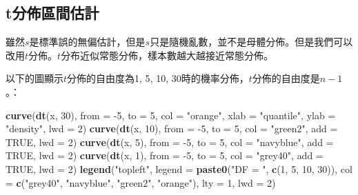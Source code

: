 \documentclass[hyperref,]{ctexart}
\newenvironment{Shaded}{\begin{snugshade}}{\end{snugshade}}
\newcommand{\DataTypeTok}[1]{\textcolor[rgb]{0.13,0.29,0.53}{#1}}
\newcommand{\DecValTok}[1]{\textcolor[rgb]{0.00,0.00,0.81}{#1}}
\newcommand{\KeywordTok}[1]{\textcolor[rgb]{0.13,0.29,0.53}{\textbf{#1}}}
\newcommand{\NormalTok}[1]{#1}
\newcommand{\OtherTok}[1]{\textcolor[rgb]{0.56,0.35,0.01}{#1}}
\newcommand{\StringTok}[1]{\textcolor[rgb]{0.31,0.60,0.02}{#1}}
\begin{document}
\hypertarget{tux5206ux4f48ux5340ux9593ux4f30ux8a08}{%
\subsection{t分佈區間估計}\label{tux5206ux4f48ux5340ux9593ux4f30ux8a08}}

雖然\(s\)是標準誤的無偏估計，但是\(s\)只是隨機亂數，並不是母體分佈。但是我們可以改用\(t\)分佈。\(t\)分布近似常態分佈，樣本數越大越接近常態分佈。

以下的圖顯示\(t\)分佈的自由度為1, 5, 10,
30時的機率分佈，\(t\)分佈的自由度是\(n-1\)。：

\begin{Shaded}
\begin{Highlighting}[]
\KeywordTok{curve}\NormalTok{(}\KeywordTok{dt}\NormalTok{(x, }\DecValTok{30}\NormalTok{), }\DataTypeTok{from =} \DecValTok{-5}\NormalTok{, }\DataTypeTok{to =} \DecValTok{5}\NormalTok{, }\DataTypeTok{col =} \StringTok{"orange"}\NormalTok{, }
      \DataTypeTok{xlab =} \StringTok{"quantile"}\NormalTok{, }\DataTypeTok{ylab =} \StringTok{"density"}\NormalTok{, }\DataTypeTok{lwd =} \DecValTok{2}\NormalTok{)}
\KeywordTok{curve}\NormalTok{(}\KeywordTok{dt}\NormalTok{(x, }\DecValTok{10}\NormalTok{), }\DataTypeTok{from =} \DecValTok{-5}\NormalTok{, }\DataTypeTok{to =} \DecValTok{5}\NormalTok{, }\DataTypeTok{col =} \StringTok{"green2"}\NormalTok{, }\DataTypeTok{add =} \OtherTok{TRUE}\NormalTok{, }\DataTypeTok{lwd =} \DecValTok{2}\NormalTok{)}
\KeywordTok{curve}\NormalTok{(}\KeywordTok{dt}\NormalTok{(x, }\DecValTok{5}\NormalTok{), }\DataTypeTok{from =} \DecValTok{-5}\NormalTok{, }\DataTypeTok{to =} \DecValTok{5}\NormalTok{, }\DataTypeTok{col =} \StringTok{"navyblue"}\NormalTok{, }\DataTypeTok{add =} \OtherTok{TRUE}\NormalTok{, }\DataTypeTok{lwd =} \DecValTok{2}\NormalTok{)}
\KeywordTok{curve}\NormalTok{(}\KeywordTok{dt}\NormalTok{(x, }\DecValTok{1}\NormalTok{), }\DataTypeTok{from =} \DecValTok{-5}\NormalTok{, }\DataTypeTok{to =} \DecValTok{5}\NormalTok{, }\DataTypeTok{col =} \StringTok{"grey40"}\NormalTok{, }\DataTypeTok{add =} \OtherTok{TRUE}\NormalTok{, }\DataTypeTok{lwd =} \DecValTok{2}\NormalTok{)}
\KeywordTok{legend}\NormalTok{(}\StringTok{"topleft"}\NormalTok{, }\DataTypeTok{legend =} \KeywordTok{paste0}\NormalTok{(}\StringTok{"DF = "}\NormalTok{, }\KeywordTok{c}\NormalTok{(}\DecValTok{1}\NormalTok{, }\DecValTok{5}\NormalTok{, }\DecValTok{10}\NormalTok{, }\DecValTok{30}\NormalTok{)),}
       \DataTypeTok{col =} \KeywordTok{c}\NormalTok{(}\StringTok{"grey40"}\NormalTok{, }\StringTok{"navyblue"}\NormalTok{, }\StringTok{"green2"}\NormalTok{, }\StringTok{"orange"}\NormalTok{),}
       \DataTypeTok{lty =} \DecValTok{1}\NormalTok{, }\DataTypeTok{lwd =} \DecValTok{2}\NormalTok{)}
\end{Highlighting}
\end{Shaded}
\end{document}
